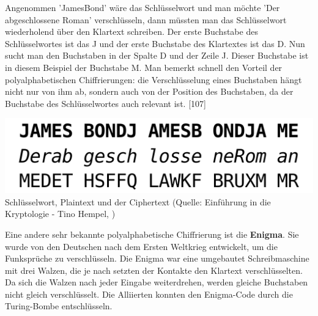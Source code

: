 \documentclass[12pt,a4paper]{report}
\begin{document}
\begin{onehalfspace}
Angenommen 'JamesBond' wäre das Schlüsselwort und man möchte 'Der abgeschlossene Roman' verschlüsseln, dann müssten man das Schlüsselwort wiederholend über den Klartext schreiben. Der erste Buchstabe des Schlüsselwortes ist das J und der erste Buchstabe des Klartextes ist das D. Nun sucht man den Buchstaben in der Spalte D und der Zeile J. Dieser Buchstabe ist in diesem Beispiel der Buchstabe M. Man bemerkt schnell den Vorteil der polyalphabetischen Chiffrierungen: die Verschlüsselung eines Buchstaben hängt nicht nur von ihm ab, sondern auch von der Position des Buchstaben, da der Buchstabe des Schlüsselwortes auch relevant ist. [107]

\begin{center}
\includegraphics[scale=0.5]{img/vingere.png}\\
Schlüsselwort, Plaintext und der Ciphertext (Quelle: Einführung in die Kryptologie - Tino Hempel, \cite{krypto01})
\end{center}

Eine andere sehr bekannte polyalphabetische Chiffrierung ist die \textbf{Enigma}. Sie wurde von den Deutschen nach dem Ersten Weltkrieg entwickelt, um die Funksprüche zu verschlüsseln. Die Enigma war eine umgebautet Schreibmaschine mit drei Walzen, die je nach setzten der Kontakte den Klartext verschlüsselten. Da sich die Walzen nach jeder Eingabe weiterdrehen, werden gleiche Buchstaben nicht gleich verschlüsselt. Die Alliierten konnten den Enigma-Code durch die Turing-Bombe entschlüsseln.


\end{onehalfspace}
\end{document}
